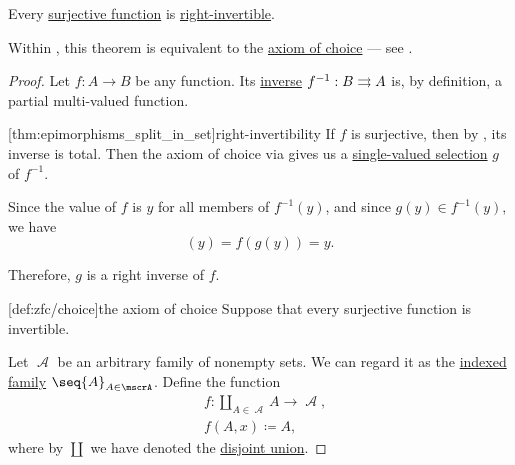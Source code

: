 \begin{theorem}\label{thm:surjective_functions_are_right_invertible}
  Every \hyperref[def:function_invertibility/surjective]{surjective function} is \hyperref[def:morphism_invertibility/right_invertible]{right-invertible}.

  Within \hyperref[def:zfc]{}, this theorem is equivalent to the \hyperref[def:zfc/choice]{axiom of choice} --- see .
\end{theorem}
\begin{proof}
  Let \( f: A \to B \) be any function. Its \hyperref[def:multi_valued_function/inverse]{inverse} \( f^{-1}: B \rightrightarrows A \) is, by definition, a partial multi-valued function.

  [thm:epimorphisms_split_in_set]{right-invertibility} If \( f \) is surjective, then by , its inverse is total. Then the axiom of choice via  gives us a \hyperref[def:function/selection]{single-valued selection} \( g \) of \( f^{-1} \).

  Since the value of \( f \) is \( y \) for all members of \( f^{-1}(y) \), and since \( g(y) \in f^{-1}(y) \), we have
  \begin{equation*}
    [f \bincirc g](y) = f(g(y)) = y.
  \end{equation*}

  Therefore, \( g \) is a right inverse of \( f \).

  [def:zfc/choice]{the axiom of choice} Suppose that every surjective function is invertible.

  Let \( \mscrA \) be an arbitrary family of nonempty sets. We can regard it as the \hyperref[def:cartesian_product/indexed_family]{indexed family} \( \seq{ A }_{A \in \mscrA} \). Define the function
  \begin{equation*}
    \begin{aligned}
      &f: \coprod_{A \in \mscrA} A \to \mscrA, \\
      &f(A, x) \coloneqq A,
    \end{aligned}
  \end{equation*}
  where by \( \coprod \) we have denoted the \hyperref[def:disjoint_union]{disjoint union}.


\end{proof}
